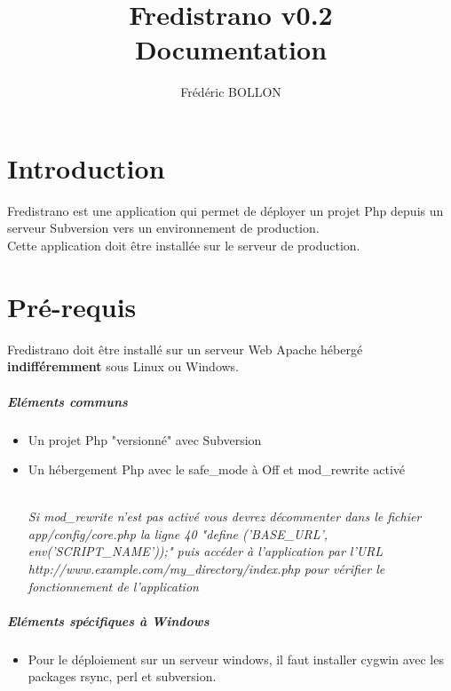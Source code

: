 \documentclass[12pt,a4paper]{report}
\author{Frédéric BOLLON}
\title{Fredistrano v0.2\\Documentation\\}
\begin{document}
\maketitle
\tableofcontents

\chapter{Introduction}
Fredistrano est une application qui permet de déployer un projet Php depuis un serveur Subversion vers un environnement de production.\\
Cette application doit \^{e}tre installée sur le serveur de production.

\chapter{Pré-requis}

Fredistrano doit \^{e}tre installé sur un serveur Web Apache hébergé \textbf{indifféremment} sous Linux ou Windows. 

\paragraph*{Eléments communs}
\begin{itemize}
\item
Un projet Php "versionné" avec Subversion
\item 
Un hébergement Php avec le safe\_mode à Off et mod\_rewrite activé	\\\\
\begin{small}\textit{Si mod\_rewrite n'est pas activé vous devrez décommenter dans le fichier app/config/core.php la ligne 40 "define ('BASE\_URL', env('SCRIPT\_NAME'));" puis accéder à l'application par l'URL\\ http://www.example.com/my\_directory/index.php pour vérifier le fonctionnement de l'application}\end{small}
\end{itemize}

\paragraph*{Eléments spécifiques à Windows}
\begin{itemize}
\item
Pour le déploiement sur un serveur windows, il faut installer cygwin avec les packages rsync, perl et subversion.

\end{itemize}
\end{document}
